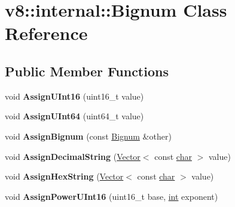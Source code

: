 \hypertarget{classv8_1_1internal_1_1Bignum}{}\section{v8\+:\+:internal\+:\+:Bignum Class Reference}
\label{classv8_1_1internal_1_1Bignum}
\subsection*{Public Member Functions}
\begin{DoxyCompactItemize}
\item 
\mbox{\label{classv8_1_1internal_1_1Bignum_a4494bf1b9c7019cbf4e4f68e5db6530f}} 
void {\bfseries Assign\+U\+Int16} (uint16\+\_\+t value)
\item 
\mbox{\label{classv8_1_1internal_1_1Bignum_aa6b480a8b87a4d88f12c70e5e5e29cc9}} 
void {\bfseries Assign\+U\+Int64} (uint64\+\_\+t value)
\item 
\mbox{\label{classv8_1_1internal_1_1Bignum_a579dd1d065e3dd01c596b230c150b6b0}} 
void {\bfseries Assign\+Bignum} (const \mbox{\hyperlink{classv8_1_1internal_1_1Bignum}{Bignum}} \&other)
\item 
\mbox{\label{classv8_1_1internal_1_1Bignum_a7815f04f794492a92c30a495e1a1f9ab}} 
void {\bfseries Assign\+Decimal\+String} (\mbox{\hyperlink{classv8_1_1internal_1_1Vector}{Vector}}$<$ const \mbox{\hyperlink{classchar}{char}} $>$ value)
\item 
\mbox{\label{classv8_1_1internal_1_1Bignum_a6768408361ec5bf75c6be7bfc06de11a}} 
void {\bfseries Assign\+Hex\+String} (\mbox{\hyperlink{classv8_1_1internal_1_1Vector}{Vector}}$<$ const \mbox{\hyperlink{classchar}{char}} $>$ value)
\item 
\mbox{\label{classv8_1_1internal_1_1Bignum_a780344bc5af94ce23ad33cd2a7a9d497}} 
void {\bfseries Assign\+Power\+U\+Int16} (uint16\+\_\+t base, \mbox{\hyperlink{classint}{int}} exponent)
\item 
\mbox{\label{classv8_1_1internal_1_1Bignum_ac7ff62980b1599577a60d292076fd0df}} 

\end{DoxyCompactItemize}
